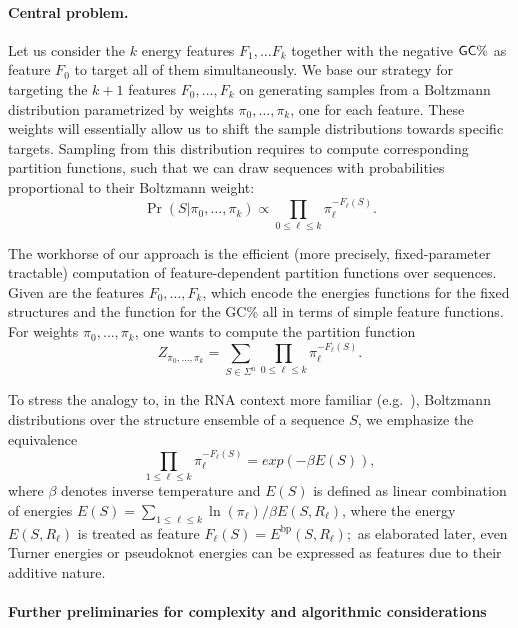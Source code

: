 \documentclass{bmcart}
\newcommand{\partfun}[1]{Z_{#1}}
\newcommand{\EbpSym}{E^{\textrm{bp}}}
\newcommand{\Nuc}[1]{{\sf #1}}
\newcommand{\Cb}{\Nuc{C}}
\newcommand{\Gb}{\Nuc{G}}
\newcommand{\GCb}{\Gb\Cb}
\newcommand{\citep}[1]{\cite{#1}}
\begin{document}
\paragraph{Central problem.}
Let us consider the $k$ energy features $F_1,\dots F_k$ together with the negative $\GCb\%$ as feature $F_0$ to target all of them simultaneously. We base our strategy for targeting the $k+1$ features $F_0,\dots,F_k$ on generating samples from a Boltzmann distribution parametrized by weights $\pi_0,\dots,\pi_k$, one for each feature. These weights will essentially allow us to shift the sample distributions towards specific targets. Sampling from this distribution requires to compute corresponding partition functions, such that we can draw sequences with probabilities proportional to their Boltzmann weight:
\begin{equation}
\label{eq:sample-distribution}
\Pr(S|\pi_0,\dots,\pi_k) \propto \prod_{0\leq \ell\leq k} \pi_\ell^{-F_\ell(S)}.
\end{equation}

The workhorse of our approach is the efficient (more precisely, fixed-parameter tractable) computation of feature-dependent partition functions over sequences.
Given are the features $F_0,\dots,F_k$, which encode the energies functions for the fixed structures and the function for the \GCb\% all in terms of simple feature functions.
For weights $\pi_0,\dots,\pi_k$, one wants to compute the partition function
  \begin{equation}
    \label{eq:mainproblem}
    \partfun{\pi_0,\dots,\pi_k} = \sum_{S\in\Sigma^n} \prod_{0\leq \ell\leq k} \pi_\ell^{-F_\ell(S)}.
  \end{equation}

To stress the analogy to, in the RNA context more familiar (e.g.~\citep{McCaskill1990}), Boltzmann distributions over the structure ensemble of a sequence $S$, we emphasize the equivalence
\begin{equation}
\label{eq:feature-energy-transformation}
\prod_{1\leq \ell \leq k} \pi_\ell^{-F_\ell(S)} = exp(-\beta E(S)),
\end{equation}
where $\beta$ denotes inverse temperature and $E(S)$ is defined as linear combination of energies $E(S)=\sum_{1\leq \ell \leq k} \ln(\pi_\ell)/\beta E(S,R_\ell)$,
where the energy $E(S,R_\ell)$ is treated as feature $F_\ell(S) = \EbpSym(S,R_\ell);$ as elaborated later, even Turner energies or pseudoknot energies can be expressed as features due to their additive nature. 

\paragraph{Further preliminaries for complexity and algorithmic considerations} 
\end{document}
